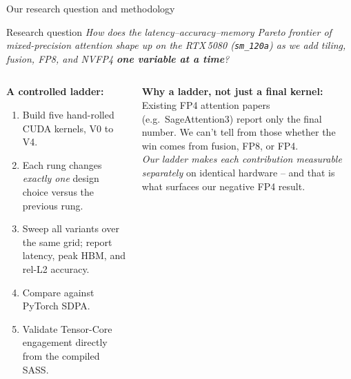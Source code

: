 \documentclass[10pt,aspectratio=169]{beamer}
\begin{document}
\begin{frame}{Our research question and methodology}
  \begin{block}{Research question}
    \emph{How does the latency--accuracy--memory Pareto frontier of
    mixed-precision attention shape up on the RTX\,5080
    (\texttt{sm\_120a}) as we add tiling, fusion, FP8, and NVFP4
    \textbf{one variable at a time}?}
  \end{block}
  \vspace{0.4em}
  \begin{columns}[T]
      \begin{whatif}
        \textbf{A controlled ladder:}
        \begin{enumerate}
          \item Build five hand-rolled CUDA kernels, V0 to V4.
          \item Each rung changes \emph{exactly one} design choice
                versus the previous rung.
          \item Sweep all variants over the same grid; report
                latency, peak HBM, and rel-L2 accuracy.
          \item Compare against PyTorch SDPA.
          \item Validate Tensor-Core engagement directly from the
                compiled SASS.
        \end{enumerate}
      \end{whatif}
      \begin{aha}
        \textbf{Why a ladder, not just a final kernel:}\\[4pt]
        Existing FP4 attention papers (e.g.\ SageAttention3) report
        only the final number. We can't tell from those whether the
        win comes from fusion, FP8, or FP4.\\[4pt]
        \emph{Our ladder makes each contribution measurable
        separately} on identical hardware -- and that is what surfaces
        our negative FP4 result.
      \end{aha}
  \end{columns}
\end{frame}
\end{document}
